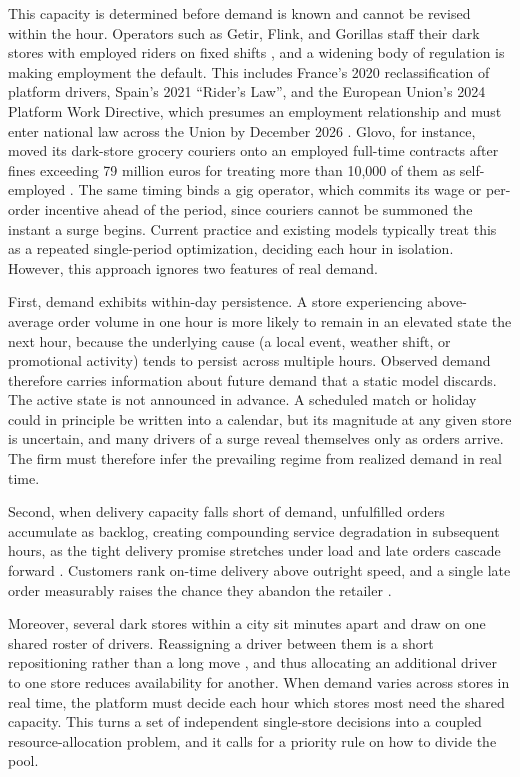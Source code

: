 \documentclass[preprint,11pt,authoryear]{elsarticle}
\theoremstyle{remark}
\begin{document}
This capacity is determined before demand is known and cannot be revised within the hour. Operators such as Getir, Flink, and Gorillas staff their dark stores with employed riders on fixed shifts \citep{handelsblatt_qcommerce_labor}, and a widening body of regulation is making employment the default. This includes  France's 2020 reclassification of platform drivers, Spain's 2021 ``Rider's Law'', and the European Union's 2024 Platform Work Directive, which presumes an employment relationship and must enter national law across the Union by December 2026 \citep{eu_platform_work_directive_2024}. Glovo, for instance, moved its dark-store grocery couriers onto an employed full-time contracts after fines exceeding 79 million euros for treating more than 10,000 of them as self-employed \citep{bhrrc_glovo_employees}. The same timing binds a gig operator, which commits its wage or per-order incentive ahead of the period, since couriers cannot be summoned the instant a surge begins. Current practice and existing models typically treat this as a repeated single-period optimization, deciding each hour in isolation. However, this approach ignores two features of real demand.

First, demand exhibits within-day persistence. A store experiencing above-average order volume in one hour is more likely to remain in an elevated state the next hour, because the underlying cause (a local event, weather shift, or promotional activity) tends to persist across multiple hours. Observed demand therefore carries information about future demand that a static model discards. The active state is not announced in advance. A scheduled match or holiday could in principle be written into a calendar, but its magnitude at any given store is uncertain, and many drivers of a surge reveal themselves only as orders arrive. The firm must therefore infer the prevailing regime from realized demand in real time.

Second, when delivery capacity falls short of demand, unfulfilled orders accumulate as backlog, creating compounding service degradation in subsequent hours, as the tight delivery promise stretches under load and late orders cascade forward \citep{medianama_10min_rollback}. Customers rank on-time delivery above outright speed, and a single late order measurably raises the chance they abandon the retailer \citep{mckinsey_ecommerce_delivery}.

Moreover, several dark stores within a city sit minutes apart and draw on one shared roster of drivers. Reassigning a driver between them is a short repositioning rather than a long move  \citep{AfecheLiuMaglaras2023}, and thus allocating an additional driver to one store reduces availability for another. When demand varies across stores in real time, the platform must decide each hour which stores most need the shared capacity. This turns a set of independent single-store decisions into a coupled resource-allocation problem, and it calls for a priority rule on how to divide the pool.
\end{document}

